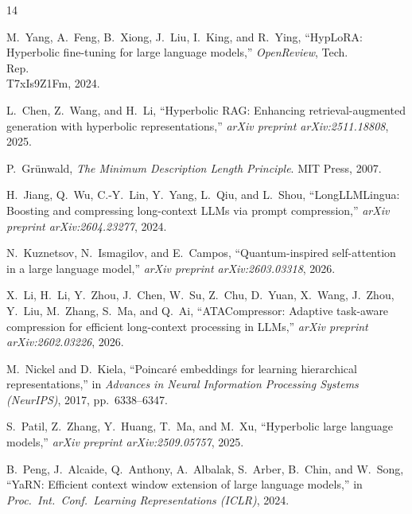 \documentclass[journal]{IEEEtran}
\begin{document}
\begin{thebibliography}{14}

M.~Yang, A.~Feng, B.~Xiong, J.~Liu, I.~King, and R.~Ying,
``HypLoRA: Hyperbolic fine-tuning for large language models,''
\emph{OpenReview}, Tech.\\ Rep.\\ T7xIs9Z1Fm, 2024.

L.~Chen, Z.~Wang, and H.~Li,
``Hyperbolic RAG: Enhancing retrieval-augmented generation with
hyperbolic representations,''
\emph{arXiv preprint arXiv:2511.18808}, 2025.

P.~Gr\"{u}nwald,
\emph{The Minimum Description Length Principle}.
MIT Press, 2007.

H.~Jiang, Q.~Wu, C.-Y.~Lin, Y.~Yang, L.~Qiu, and L.~Shou,
``LongLLMLingua: Boosting and compressing long-context {LLMs} via prompt
compression,''
\emph{arXiv preprint arXiv:2604.23277}, 2024.

N.~Kuznetsov, N.~Ismagilov, and E.~Campos,
``Quantum-inspired self-attention in a large language model,''
\emph{arXiv preprint arXiv:2603.03318}, 2026.

X.~Li, H.~Li, Y.~Zhou, J.~Chen, W.~Su, Z.~Chu, D.~Yuan, X.~Wang,
J.~Zhou, Y.~Liu, M.~Zhang, S.~Ma, and Q.~Ai,
``{ATACompressor}: Adaptive task-aware compression for efficient
long-context processing in {LLMs},''
\emph{arXiv preprint arXiv:2602.03226}, 2026.

M.~Nickel and D.~Kiela,
``Poincar\'{e} embeddings for learning hierarchical representations,''
in \emph{Advances in Neural Information Processing Systems (NeurIPS)},
2017, pp.~6338--6347.

S.~Patil, Z.~Zhang, Y.~Huang, T.~Ma, and M.~Xu,
``Hyperbolic large language models,''
\emph{arXiv preprint arXiv:2509.05757}, 2025.

B.~Peng, J.~Alcaide, Q.~Anthony, A.~Albalak, S.~Arber, B.~Chin,
and W.~Song,
``{YaRN}: Efficient context window extension of large language models,''
in \emph{Proc.\ Int.\ Conf.\ Learning Representations (ICLR)}, 2024.


\end{thebibliography}
\end{document}
